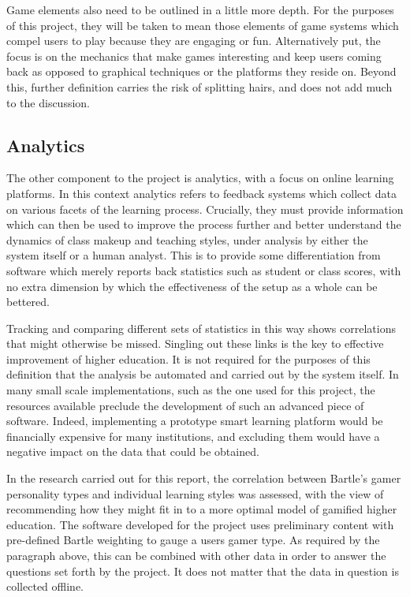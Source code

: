 \documentclass{article}
\begin{document}
Game elements also need to be outlined in a little more depth. For the purposes of this project, they will be taken to mean those elements of game systems which compel users to play because they are engaging or fun. Alternatively put, the focus is on the mechanics that make games interesting and keep users coming back as opposed to graphical techniques or the platforms they reside on. Beyond this, further definition carries the risk of splitting hairs, and does not add much to the discussion.

\subsection{Analytics}
The other component to the project is analytics, with a focus on online learning platforms. In this context analytics refers to feedback systems which collect data on various facets of the learning process. Crucially, they must provide information which can then be used to improve the process further and better understand the dynamics of class makeup and teaching styles, under analysis by either the system itself or a human analyst. This is to provide some differentiation from software which merely reports back statistics such as student or class scores, with no extra dimension by which the effectiveness of the setup as a whole can be bettered. 

Tracking and comparing different sets of statistics in this way shows correlations that might otherwise be missed. Singling out these links is the key to effective improvement of higher education. It is not required for the purposes of this definition that the analysis be automated and carried out by the system itself. In many small scale implementations, such as the one used for this project, the resources available preclude the development of such an advanced piece of software. Indeed, implementing a prototype smart learning platform would be financially expensive for many institutions, and excluding them would have a negative impact on the data that could be obtained.

In the research carried out for this report, the correlation between Bartle's gamer personality types and individual learning styles was assessed, with the view of recommending how they might fit in to a more optimal model of gamified higher education. The software developed for the project uses preliminary content with pre-defined Bartle weighting to gauge a users gamer type. As required by the paragraph above, this can be combined with other data in order to answer the questions set forth by the project. It does not matter that the data in question is collected offline.
\end{document}
